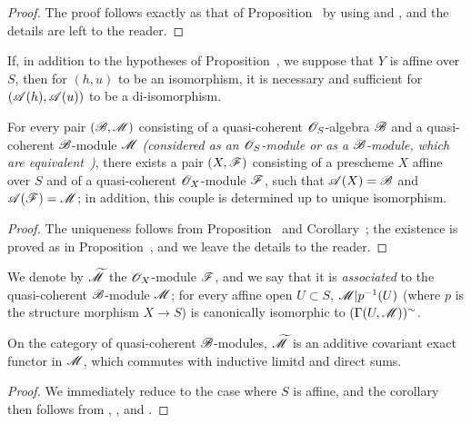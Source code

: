 \begin{proof}
The proof follows exactly as that of Proposition~ by using  and , and the details are left to the reader.
\end{proof}

\begin{corollary}[1.4.2]
\label{II.1.4.2}
If, in addition to the hypotheses of Proposition~, we suppose that $Y$ is affine over $S$, then for $(h,u)$ to be an isomorphism, it is necessary and sufficient for $(\mathscr{A}(h),\mathscr{A}(u))$ to be a di-isomorphism.
\end{corollary}

\begin{proposition}[1.4.3]
\label{II.1.4.3}
For every pair $(\mathscr{B},\mathscr{M})$ consisting of a quasi-coherent $\mathscr{O}_S$-algebra $\mathscr{B}$ and a quasi-coherent $\mathscr{B}$-module $\mathscr{M}$ \emph{(considered as an $\mathscr{O}_S$-module or as a $\mathscr{B}$-module, which are equivalent~)}, there exists a pair $(X,\mathscr{F})$ consisting of a prescheme $X$ affine over $S$ and of a quasi-coherent $\mathscr{O}_X$-module $\mathscr{F}$, such that $\mathscr{A}(X)=\mathscr{B}$ and $\mathscr{A}(\mathscr{F})=\mathscr{M}$; in addition, this couple is determined up to unique isomorphism.
\end{proposition}

\begin{proof}
The uniqueness follows from Proposition~ and Corollary~; the existence is proved as in Proposition~, and we leave the details to the reader.
\end{proof}

We denote by $\widetilde{\mathscr{M}}$ the $\mathscr{O}_X$-module $\mathscr{F}$, and we say that it is \emph{associated} to the quasi-coherent $\mathscr{B}$-module $\mathscr{M}$; for every affine open $U\subset S$, $\mathscr{M}|p^{-1}(U)$ (where $p$ is the structure morphism $X\to S$) is canonically isomorphic to $(\Gamma(U,\mathscr{M}))^\sim$.

\begin{corollary}[1.4.4]
\label{II.1.4.4}
On the category of quasi-coherent $\mathscr{B}$-modules, $\widetilde{\mathscr{M}}$ is an additive covariant exact functor in $\mathscr{M}$, which commutes with inductive limitd and direct sums.
\end{corollary}

\begin{proof}
We immediately reduce to the case where $S$ is affine, and the corollary then follows from , , and .
\end{proof}

